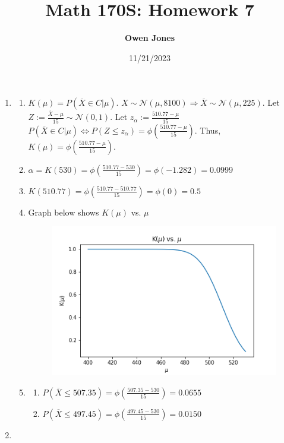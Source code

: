 \documentclass[10pt]{article}
\title{\bf Math 170S\@: Homework 7}
\date{11/21/2023}
\author{\bf Owen Jones}
\begin{document}
\maketitle
\begin{enumerate}[label=\textbf{Problem \arabic*.}]
    \item \begin{enumerate}[label=\text{\arabic*.}]
        \item $K(\mu)=P(\overline{X}\in C|\mu)$. 
        $X\sim\mathcal{N}(\mu,8100)\Rightarrow \overline{X}\sim\mathcal{N}(\mu,225)$. 
        Let $Z:=\frac{\overline{X}-\mu}{15}\sim \mathcal{N}(0,1)$.
        Let $z_\alpha:=\frac{510.77-\mu}{15}$
        $P(\overline{X}\in C|\mu)\Leftrightarrow P(Z\le z_\alpha)=\phi(\frac{510.77-\mu}{15})$.
        Thus, $K(\mu)=\phi(\frac{510.77-\mu}{15})$.
        \item $\alpha=K(530)=\phi(\frac{510.77-530}{15})=\phi(-1.282)=0.0999$
        \item $K(510.77)=\phi(\frac{510.77-510.77}{15})=\phi(0)=0.5$
        \item Graph below shows $K(\mu)$ vs. $\mu$
        \begin{figure}[H]
            \centering
            \includegraphics[scale=0.4]{Math_170_S_hw_7_q_1.png}
        \end{figure}
        \item \begin{enumerate}[label=\text{(\roman*)}]
            \item $P(\overline{X}\le 507.35)=\phi(\frac{507.35-530}{15})=0.0655$
            \item $P(\overline{X}\le 497.45)=\phi(\frac{497.45-530}{15})=0.0150$
        \end{enumerate}
    \end{enumerate}
    \item \begin{enumerate}[label=\text{\arabic*.}]

\end{enumerate}
\end{enumerate}
\end{document}
